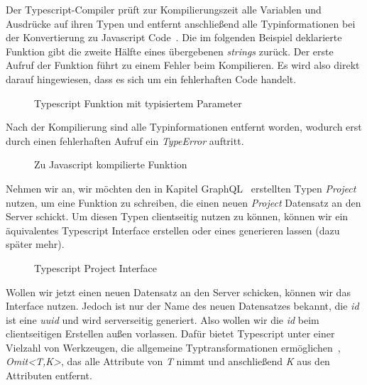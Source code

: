 Der Typescript-Compiler prüft zur Kompilierungszeit alle Variablen und Ausdrücke auf ihren Typen und entfernt anschließend alle Typinformationen
bei der Konvertierung zu Javascript Code~\cite{typescript-github-specification}.
Die im folgenden Beispiel deklarierte Funktion gibt die zweite Hälfte eines übergebenen \emph{strings} zurück.
Der erste Aufruf der Funktion führt zu einem Fehler beim Kompilieren. Es wird also direkt darauf hingewiesen, dass es sich um ein fehlerhaften Code handelt.

\begin{figure}[h]
    
    \caption{Typescript Funktion mit typisiertem Parameter}
    \label{fig:basics:typescript:1}
\end{figure}

Nach der Kompilierung sind alle Typinformationen entfernt worden, wodurch erst durch einen fehlerhaften Aufruf
ein \emph{TypeError} auftritt.

\begin{figure}[h]
    
    \caption{Zu Javascript kompilierte Funktion}
    \label{fig:basics:typescript:2}
\end{figure}

Nehmen wir an, wir möchten den in Kapitel GraphQL~ erstellten Typen \emph{Project} nutzen,
um eine Funktion zu schreiben, die einen neuen \emph{Project} Datensatz an den Server schickt. Um diesen Typen clientseitig nutzen zu können,
können wir ein äquivalentes Typescript Interface erstellen oder eines generieren lassen (dazu später mehr).

\begin{figure}[h]
    
    \caption{Typescript Project Interface}
    \label{fig:basics:typescript:3}
\end{figure}

Wollen wir jetzt einen neuen Datensatz an den Server schicken, können wir das Interface nutzen. Jedoch ist nur der Name des neuen Datensatzes bekannt,
die \emph{id} ist eine \emph{uuid} und wird serverseitig generiert. Also wollen wir die \emph{id} beim clientseitigen Erstellen außen vorlassen.
Dafür bietet Typescript unter einer Vielzahl von Werkzeugen, die allgemeine Typtransformationen ermöglichen~\cite{typescript-utility-types},
\emph{Omit<T,K>}, das alle Attribute von \emph{T} nimmt und anschließend \emph{K} aus den Attributen entfernt.

